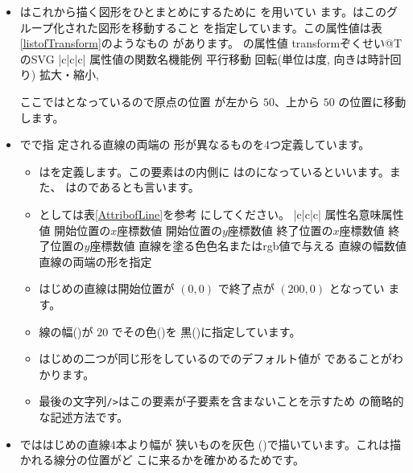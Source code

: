 \begin{itemize}
 \item {}はこれから描く図形をひとまとめにするために
       を用いてい
       ます。はこのグループ化された図形を移動すること
       を指定しています。この属性値は表\ref{listofTransform}のようなもの
       があります。
{の属性値%
%
{transformぞくせい@\protect{}}{T}{の}{SVG}}
{|c|c|c|}
{{属性値の関数名}{機能}{例}
{}{平行移動}{}
{}{回転(単位は度, 向きは時計回り)}{}
{}{拡大・縮小}{,
                            }}

       ここではとなっているので原点の位置
       が左から $50$、上から $50$ の位置に移動します。
 \item {}でで指
       定される直線の両端の
       形が異なるものを4つ定義しています。
\begin{itemize}
 \item {}はを定義します。この要素はの内側に
       はのになっているといいます。また、
       はのであるとも言います。
 \item {}としては表\ref{AttribofLine}を参考
       にしてください。
{|c|c|c|}{%
{属性名}{意味}{属性値}
{}{開始位置の$x$座標}{数値}
{}{開始位置の$y$座標}{数値}
{}{終了位置の$x$座標}{数値}
{}{終了位置の$y$座標}{数値}
{}{直線を塗る色}{色名またはrgb値で与える}
{}{直線の幅}{数値}
{}{直線の両端の形を指定}
   {{}}}

 \item はじめの直線は開始位置が $(0,0)$ で終了点が $(200,0)$ となってい
       ます。
 \item 線の幅()が $20$ でその色()を
       黒()に指定しています。
 \item はじめの二つが同じ形をしているのでのデフォルト値が
       であることがわかります。
 \item 最後の文字列\texttt{/>}はこの要素が子要素を含まないことを示すため
       の簡略的な記述方法です。
\end{itemize}
 \item {}でははじめの直線4本より幅が
       狭いものを灰色
       ()で描いています。これは描かれる線分の位置がど
       こに来るかを確かめるためです。


\end{itemize}
